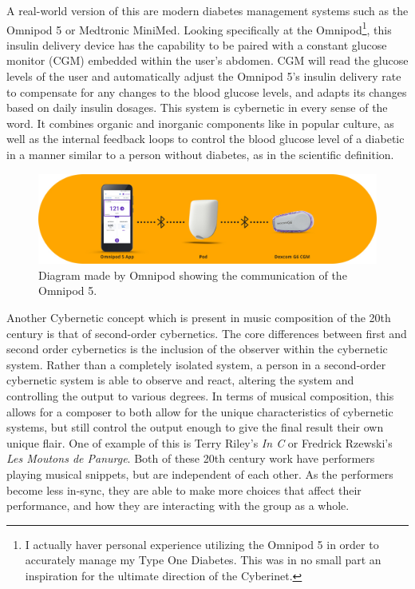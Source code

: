 A real-world version of this are modern diabetes management systems such as the Omnipod 5 or Medtronic MiniMed. Looking specifically at the Omnipod\footnote{I actually haver personal experience utilizing the Omnipod 5 in order to accurately manage my Type One Diabetes. This was in no small part an inspiration for the ultimate direction of the Cyberinet.}, this insulin delivery device has the capability to be paired with a constant glucose monitor (CGM) embedded within the user's abdomen. CGM will read the glucose levels of the user and automatically adjust the Omnipod 5's insulin delivery rate to compensate for any changes to the blood glucose levels, and adapts its changes based on daily insulin dosages. This system is cybernetic in every sense of the word. It combines organic and inorganic components like in popular culture, as well as the internal feedback loops to control the blood glucose level of a diabetic in a manner similar to a person without diabetes, as in the scientific definition.

\begin{figure} %
    \centering
    \includegraphics[scale=0.4]{diagrams/Omnipod-5_CGM_Pod_BT_1040x277.jpg}
    \caption{Diagram made by Omnipod showing the communication of the Omnipod 5.} %
    \label{fig:omnipod}
\end{figure}


Another Cybernetic concept which is present in music composition of the 20th century is that of second-order cybernetics. The core differences between first and second order cybernetics is the inclusion of the observer within the cybernetic system. Rather than a completely isolated system, a person in a second-order cybernetic system is able to observe and react, altering the system and controlling the output to various degrees. In terms of musical composition, this allows for a composer to both allow for the unique characteristics of cybernetic systems, but still control the output enough to give the final result their own unique flair. One of example of this is Terry Riley's \textit{In C} or Fredrick Rzewski's \textit{Les Moutons de Panurge}. Both of these 20th century work have performers playing musical snippets, but are independent of each other. As the performers become less in-sync, they are able to make more choices that affect their performance, and how they are interacting with the group as a whole.

